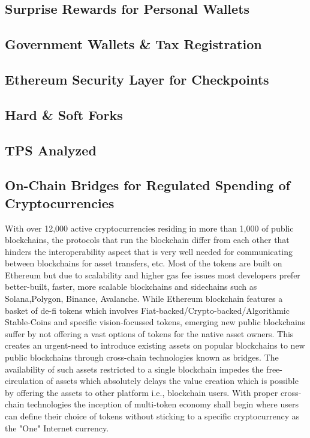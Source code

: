 \documentclass[letterpaper,11pt]{article}
\begin{document}
\subsection{Surprise Rewards for Personal Wallets}
	
\subsection{Government Wallets \& Tax Registration}

\subsection{Ethereum Security Layer for Checkpoints}

\subsection{Hard \& Soft Forks}
	
\subsection{TPS Analyzed}

\subsection{On-Chain Bridges for Regulated Spending of Cryptocurrencies}

With over 12,000 active cryptocurrencies residing in more than 1,000 of public blockchains, the protocols that run the blockchain differ from each other that hinders the interoperability aspect that is very well needed for communicating between blockchains for asset transfers, etc. Most of the tokens are built on Ethereum but due to scalability and higher gas fee issues most developers prefer better-built, faster, more scalable blockchains and sidechains such as Solana,Polygon, Binance, Avalanche. While Ethereum blockchain features a basket of de-fi tokens which involves Fiat-backed/Crypto-backed/Algorithmic Stable-Coins and specific vision-focussed tokens, emerging new public blockchains suffer by not offering a vast options of tokens for the native asset owners. This creates an urgent-need to introduce existing assets on popular blockchains to new public blockchains through cross-chain technologies known as bridges. The availability of such assets restricted to a single blockchain impedes the free-circulation of assets which absolutely delays the value creation which is possible by offering the assets to other platform i.e., blockchain users. With proper cross-chain technologies the inception of multi-token economy shall begin where users can define their choice of tokens without sticking to a specific cryptocurrency as the "One" Internet currency.\\
\end{document}
